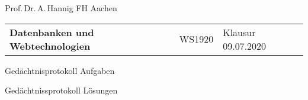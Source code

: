 \documentclass[DIV=16,parskip]{scrartcl} %
\begin{document}

\begin{flushleft}
    {\footnotesize{Prof.\,Dr.\,A.\,Hannig \textbar{ }FH Aachen}} \\

    \vspace{24pt}
    \parindent=-0.5pt
    \begin{tabu} {@{}X[l]X[c]X[r]@{}}
        {\LARGE{\textbf{Datenbanken und Webtechnologien}}} & {\Large{WS1920}} & {\textnormal{Klausur 09.07.2020}} \\
    \end{tabu}
\end{flushleft}

\vspace{24pt}

\newcommand{\udensdash}[1]{%
    \tikz[baseline=(todotted.base)]{
        \node[inner sep=1pt,outer sep=0pt] (todotted) {#1};
        \draw[densely dashed] (todotted.south west) -- (todotted.south east);
    }%
}%

\begin{section}{Gedächtnisprotokoll Aufgaben}
    
    
    
    
    
    
    
\end{section}
\pagebreak
\begin{section}{Gedächtnissprotokoll Lösungen}
    
\end{section}
\end{document}
